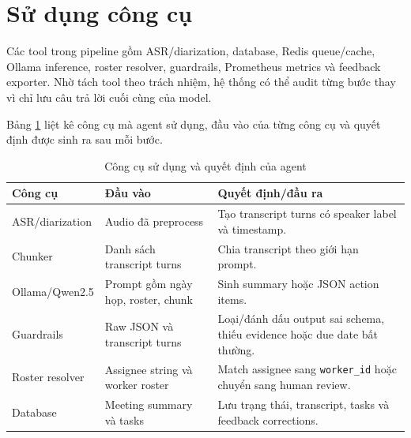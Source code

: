 \section{Sử dụng công cụ}

Các tool trong pipeline gồm ASR/diarization, database, Redis queue/cache, Ollama inference, roster resolver, guardrails, Prometheus metrics và feedback exporter. Nhờ tách tool theo trách nhiệm, hệ thống có thể audit từng bước thay vì chỉ lưu câu trả lời cuối cùng của model.

Bảng \ref{tab:agent-tools} liệt kê công cụ mà agent sử dụng, đầu vào của từng công cụ và quyết định được sinh ra sau mỗi bước.

\begin{table}[H]
\centering
\small
\caption{Công cụ sử dụng và quyết định của agent}
\label{tab:agent-tools}
\begin{tabularx}{\textwidth}{@{}p{3.0cm}X X@{}}
\toprule
\textbf{Công cụ} & \textbf{Đầu vào} & \textbf{Quyết định/đầu ra} \\
\midrule
ASR/diarization & Audio đã preprocess & Tạo transcript turns có speaker label và timestamp. \\
Chunker & Danh sách transcript turns & Chia transcript theo giới hạn prompt. \\
Ollama/Qwen2.5 & Prompt gồm ngày họp, roster, chunk & Sinh summary hoặc JSON action items. \\
Guardrails & Raw JSON và transcript turns & Loại/đánh dấu output sai schema, thiếu evidence hoặc due date bất thường. \\
Roster resolver & Assignee string và worker roster & Match assignee sang \texttt{worker\_id} hoặc chuyển sang human review. \\
Database & Meeting summary và tasks & Lưu trạng thái, transcript, tasks và feedback corrections. \\
\bottomrule
\end{tabularx}
\end{table}
